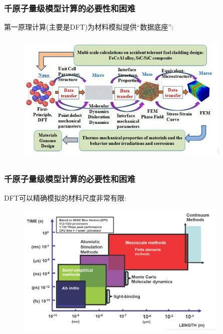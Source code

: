 \begin{frame}
	\frametitle{千原子量级模型计算的必要性和困难}
	第一原理计算(主要是\textrm{DFT})为材料模拟提供``数据底座'':
\begin{figure}[h!]
\vspace*{-0.10in}
\includegraphics[height=2.50in,width=4.05in]{Figures/Multi_Scale-5.jpg}
\label{Multi-Scale-2}
\end{figure}
\end{frame}

\begin{frame}
	\frametitle{千原子量级模型计算的必要性和困难}
	\textrm{DFT}可以精确模拟的材料尺度非常有限:
\begin{figure}[h!]
\includegraphics[height=2.50in,width=4.00in]{Figures/Multi-Scale-6.png}
\label{Multi-Scale-3}
\end{figure}
\end{frame}

